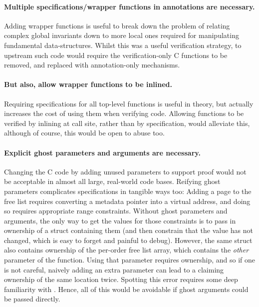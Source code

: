 \paragraph{Multiple specifications/wrapper functions in annotations are
necessary.} Adding wrapper functions is useful to break down the problem of
relating complex global invariants down to more local ones required for
manipulating fundamental data-structures. Whilst this was a useful verification
strategy, to upstream such code would require the verification-only C functions
to be removed, and replaced with annotation-only mechanisms.

\paragraph{But also, allow wrapper functions to be inlined.} Requiring
specifications for all top-level functions is useful in theory, but actually
increases the cost of using them when verifying code. Allowing functions to be
verified by inlining at call site, rather than by specification, would
alleviate this, although of course, this would be open to abuse too.

\paragraph{Explicit ghost parameters and arguments are necessary.} Changing the
C code by adding unused parameters to support proof would not be acceptable in
almost all large, real-world code bases. Reifying ghost parameters complicates
specifications in tangible ways too: Adding a page to the free list requires
converting a metadata pointer into a virtual address, and doing so requires
appropriate range constraints. Without ghost parameters and arguments, the only
way to get the values for those constraints is to pass in ownership of a struct
containing them (and then constrain that the value has not changed, which is
easy to forget and painful to debug). However, the same struct also contains
ownership of the per-order free list array, which contains the \emph{other}
parameter of the function. Using that parameter requires ownership, and so if
one is not careful, naively adding an extra parameter can lead to a claiming
ownership of the same location twice. Spotting this error requires some deep familiarity with .
Hence, all of this would be avoidable if ghost arguments could be passed
directly.

